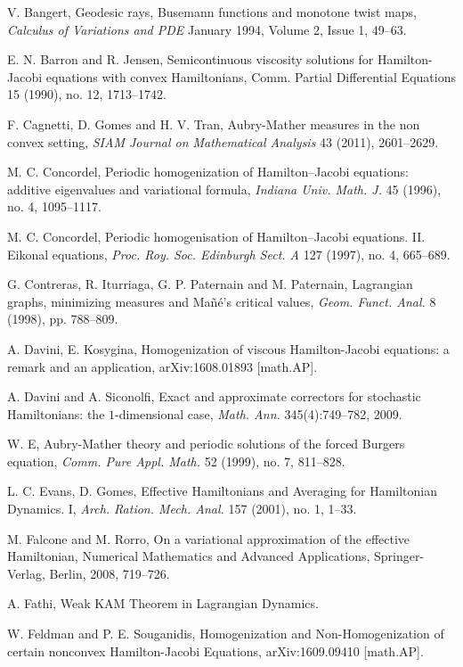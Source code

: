 \documentclass[12pt,reqno]{amsart}
\theoremstyle{plain}
\theoremstyle{remark}
\numberwithin{equation}{section}
\begin{document}
\begin{thebibliography}{99}
V. Bangert,  
{Geodesic rays, Busemann functions and monotone twist maps}, 
\emph{Calculus of Variations and PDE}
January 1994, Volume 2, Issue 1, 49--63.  

 E. N. Barron and R. Jensen, Semicontinuous viscosity solutions for Hamilton-Jacobi equations with convex Hamiltonians, Comm. Partial Differential Equations 15 (1990), no. 12, 1713--1742.

F. Cagnetti, D. Gomes and H. V. Tran, 
Aubry-Mather measures in the non convex setting, 
\emph{SIAM Journal on Mathematical Analysis} 43 (2011), 2601--2629.

 M. C. Concordel, 
Periodic homogenization of Hamilton--Jacobi equations: additive
eigenvalues and variational formula, 
\emph{Indiana Univ. Math. J.} 45 (1996), no. 4, 1095--1117.

 M. C. Concordel, 
Periodic homogenisation of Hamilton--Jacobi equations. II. Eikonal
equations, 
\emph{Proc. Roy. Soc. Edinburgh Sect. A} 127 (1997), no. 4, 665--689.

 G. Contreras, R. Iturriaga, G. P. Paternain and M. Paternain, 
Lagrangian graphs, minimizing measures and Ma\~n\'e's critical values, 
\emph{Geom. Funct. Anal.} 8 (1998), pp. 788--809.




 A. Davini, E. Kosygina,
Homogenization of viscous Hamilton-Jacobi equations: a remark and an application,
arXiv:1608.01893 [math.AP].

A. Davini and A. Siconolfi,
Exact and approximate correctors for stochastic Hamiltonians:
the $1$-dimensional case,
\emph{Math. Ann.} 345(4):749--782, 2009.


W. E, 
Aubry-Mather theory and periodic solutions of the forced Burgers equation,
\emph{Comm. Pure Appl. Math.} 52 (1999), no. 7, 811--828.

L. C. Evans, D. Gomes, 
Effective Hamiltonians and Averaging for Hamiltonian Dynamics. I, 
\emph{Arch. Ration. Mech. Anal.} 157 (2001), no. 1, 1--33.

M. Falcone and M. Rorro, 
On a variational approximation of the effective Hamiltonian, 
Numerical Mathematics and Advanced Applications, Springer-Verlag, Berlin, 2008, 719--726.

A. Fathi, Weak KAM Theorem in Lagrangian Dynamics.

W. Feldman and P. E. Souganidis,
Homogenization and Non-Homogenization of certain nonconvex Hamilton-Jacobi Equations,
arXiv:1609.09410 [math.AP].


\end{thebibliography}
\end{document}
